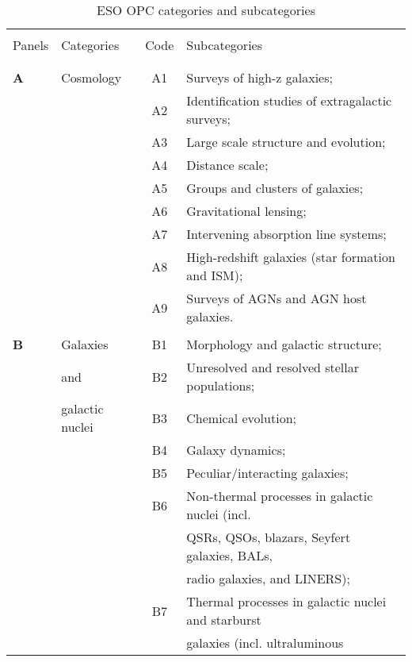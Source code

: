 \documentclass{article}
\begin{document}
\begin{table}[p]
\caption{ESO OPC categories and subcategories}
\label{tab:categories}
\medskip
{\small\sf
\begin{center}
\begin{tabular}{llcl} 
\hline\hline
& & & \\
Panels & Categories & Code & Subcategories \\
& & & \\
\hline 
& & & \\[-6pt]
{\bf A}& Cosmology & A1 & Surveys of high-z galaxies; \\
       &           & A2 & Identification studies of extragalactic surveys; \\
       &           & A3 & Large scale structure and evolution; \\
       &           & A4 & Distance scale; \\  
       &           & A5 & Groups and clusters of galaxies; \\  
       &           & A6 & Gravitational lensing; \\  
       &           & A7 & Intervening absorption line systems; \\  
       &           & A8 & High-redshift galaxies (star formation and ISM); \\
       &           & A9 & Surveys of AGNs and AGN host galaxies. \\[4pt]
\hline
& & & \\[-6pt]
{\bf B}& Galaxies  & B1 & Morphology and galactic structure; \\  
       & and       & B2 & Unresolved and resolved stellar populations; \\  
       & galactic nuclei & B3 & Chemical evolution; \\  
       &           & B4 & Galaxy dynamics; \\  
       &           & B5 & Peculiar/interacting galaxies; \\   
       &           & B6 & Non-thermal processes in galactic nuclei (incl. \\
       &           &    &  QSRs, QSOs, blazars, Seyfert galaxies, BALs, \\ 
       &           &    &  radio galaxies, and LINERS); \\  
       &           & B7 & Thermal processes in galactic nuclei and starburst\\
       &           &    &  galaxies (incl. ultraluminous \\  

\end{tabular}
\end{center}}
\end{table}
\end{document}
